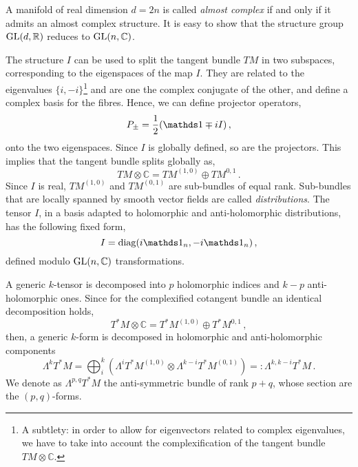 \documentclass[debug]{phd}
\begin{document}
						A manifold of real dimension $d=2n$ is called \emph{almost complex} if and only if it admits an almost complex structure. 
						It is easy to show that the structure group $\mathrm{GL}(d, \mathbb{R})$ reduces to $\mathrm{GL}(n, \mathbb{C})$.
						
						The structure $I$ can be used to split the tangent bundle $TM$ in two subspaces, corresponding to the eigenspaces of the map $I$. 
						They are related to the eigenvalues $\{ i, -i \}$\footnote{%
							A subtlety: in order to allow for eigenvectors related to complex eigenvalues, we have to take into account the complexification of the tangent bundle $TM \otimes \mathbb{C}$.%
							}
						and are one the complex conjugate of the other, and define a complex basis for the fibres.
						Hence, we can define projector operators,
								\begin{equation}
									P_{\pm} = \frac{1}{2}\left(\id \mp i I \right)\, ,
								\end{equation}
						onto the two eigenspaces.
						Since $I$ is globally defined, so are the projectors. This implies that the tangent bundle splits globally as,
								\begin{equation}\label{tsplit}
									TM \otimes \mathbb{C} = TM^{(1,0)} \oplus TM^{0,1}	\, .
								\end{equation}
						Since $I$ is real, $TM^{(1,0)}$ and $TM^{(0,1)}$ are sub-bundles of equal rank.
						Sub-bundles that are locally spanned by smooth vector fields are called \emph{distributions}.
						The tensor $I$, in a basis adapted to holomorphic and anti-holomorphic distributions, has the following fixed form,
								\begin{equation}
									I = \diag( i \id_n , -i \id_n )\, ,
								\end{equation}
						defined modulo $\mathrm{GL}(n, \mathbb{C})$ transformations.
						
						A generic $k$-tensor is decomposed into $p$ holomorphic indices and $k-p$ anti-holomorphic ones.
						Since for the complexified cotangent bundle an identical decomposition holds,
								\begin{equation}
									T^*M \otimes \mathbb{C} = T^*M^{(1,0)} \oplus T^*M^{0,1}\, ,
								\end{equation}
						then, a generic $k$-form is decomposed in holomorphic and anti-holomorphic components
								\begin{equation}
									\Lambda^k T^*M = \bigoplus_{i}^k \left( \Lambda^i T^*M^{(1,0)} \otimes \Lambda^{k-i} T^*M^{(0,1)} \right) =: \Lambda^{k,k-i} T^*M\, .
								\end{equation}
						We denote as $\Lambda^{p,q} T^*M$ the anti-symmetric bundle of rank $p+q$, whose section are the $(p,q)$-forms.\\
						
\end{document}
